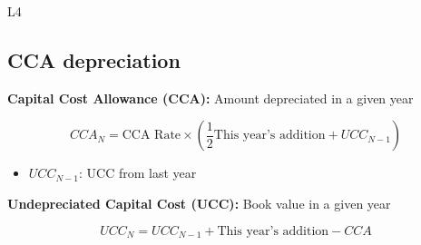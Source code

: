 \begin{example}
    L4
\end{example}

\subsection{CCA depreciation}
\begin{definition}

    \textbf{Capital Cost Allowance (CCA):} Amount depreciated in a given year
        
    \begin{equation}
        CCA_N = \text{CCA Rate} \times \left(\frac{1}{2} \text{This year's addition} + UCC_{N-1}\right)    
    \end{equation} 
    
    \begin{itemize}
        \item $UCC_{N-1}$: UCC from last year
    \end{itemize}
    
    \textbf{Undepreciated Capital Cost (UCC):} Book value in a given year
    
    \begin{equation}
        UCC_N = UCC_{N-1} + \text{This year's addition} - CCA
    \end{equation}

\end{definition}